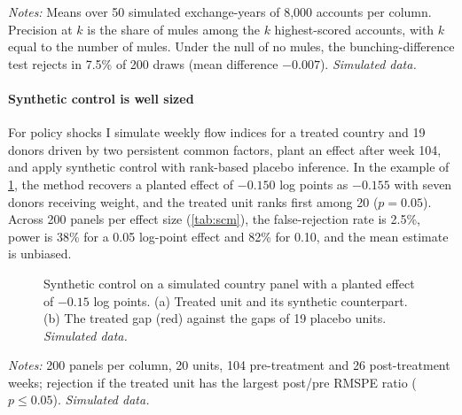 \begin{table}[!htbp]
\centering\small
\begin{threeparttable}
\caption{Monte Carlo performance of detectors and of the bunching-difference test}
\label{tab:mc}

\begin{tablenotes}[flushleft]\footnotesize
\item \emph{Notes:} Means over 50 simulated exchange-years of 8,000 accounts per column. Precision at $k$ is the share of
mules among the $k$ highest-scored accounts, with $k$ equal to the number of mules. Under the null of no mules, the
bunching-difference test rejects in 7.5\% of 200 draws (mean difference $-0.007$). \emph{Simulated data.}
\end{tablenotes}
\end{threeparttable}
\end{table}

\paragraph{Synthetic control is well sized}
For policy shocks I simulate weekly flow indices for a treated country and 19 donors driven by two persistent common
factors, plant an effect after week 104, and apply synthetic control with rank-based placebo inference. In the example
of \cref{fig:synth}, the method recovers a planted effect of $-0.150$ log points as $-0.155$ with seven donors receiving
weight, and the treated unit ranks first among 20 ($p=0.05$). Across 200 panels per effect size (\cref{tab:scm}), the
false-rejection rate is 2.5\%, power is 38\% for a 0.05 log-point effect and 82\% for 0.10, and the mean estimate is
unbiased.

\begin{figure}[!htbp]
\centering
{}
\caption{Synthetic control on a simulated country panel with a planted effect of $-0.15$ log points. (a) Treated unit
and its synthetic counterpart. (b) The treated gap (red) against the gaps of 19 placebo units. \emph{Simulated data.}}
\label{fig:synth}
\end{figure}

\begin{table}[!htbp]
\centering\small
\begin{threeparttable}
\caption{Size and power of synthetic control in simulated country panels}
\label{tab:scm}

\begin{tablenotes}[flushleft]\footnotesize
\item \emph{Notes:} 200 panels per column, 20 units, 104 pre-treatment and 26 post-treatment weeks; rejection if the
treated unit has the largest post/pre RMSPE ratio ($p\le 0.05$). \emph{Simulated data.}
\end{tablenotes}
\end{threeparttable}
\end{table}

